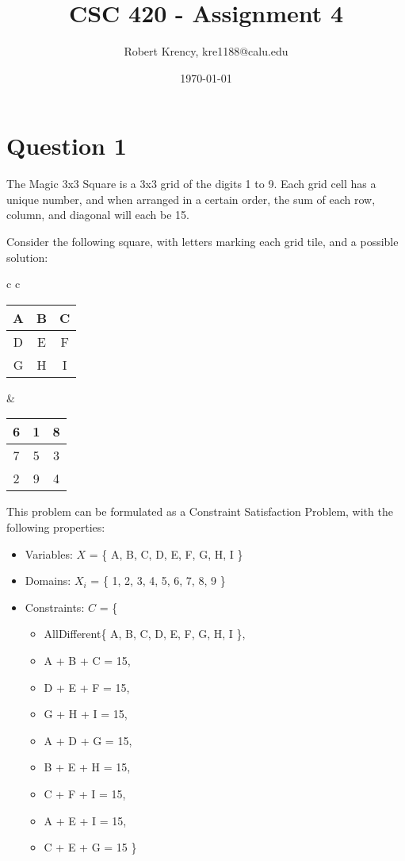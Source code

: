 \documentclass[12pt]{article}
\title{CSC 420 - Assignment 4}
\author{Robert Krency, kre1188@calu.edu \\}
\date{\today}
\begin{document}
\maketitle

\section{Question 1}

The Magic 3x3 Square is a 3x3 grid of the digits 1 to 9. Each grid cell has a unique number, and when arranged in a certain order,
the sum of each row, column, and diagonal will each be 15. 

Consider the following square, with letters marking each grid tile, and a possible solution:

\begin{center}

\begin{tabular}{c c}

\begin{tabular}{| c | c | c |}
    \hline 
    A & B & C \\ \hline
    D & E & F \\ \hline
    G & H & I \\ \hline
\end{tabular}

&

\begin{tabular}{| c | c | c |}
    \hline 
    6 & 1 & 8 \\ \hline
    7 & 5 & 3 \\ \hline
    2 & 9 & 4 \\ \hline
\end{tabular}

\end{tabular}
\end{center}

This problem can be formulated as a Constraint Satisfaction Problem, with the following properties:

\begin{itemize}
    \item Variables: $X$ = \{ A, B, C, D, E, F, G, H, I \}
    \item Domains: $X_i$ = \{ 1, 2, 3, 4, 5, 6, 7, 8, 9 \}
    \item Constraints: $C$ = \{
    \begin{itemize}
        \item AllDifferent\{ A, B, C, D, E, F, G, H, I \},
        \item A + B + C = 15,
        \item D + E + F = 15,
        \item G + H + I = 15,
        \item A + D + G = 15,
        \item B + E + H = 15,
        \item C + F + I = 15,
        \item A + E + I = 15,
        \item C + E + G = 15 \}
    \end{itemize}
\end{itemize}
\end{document}
